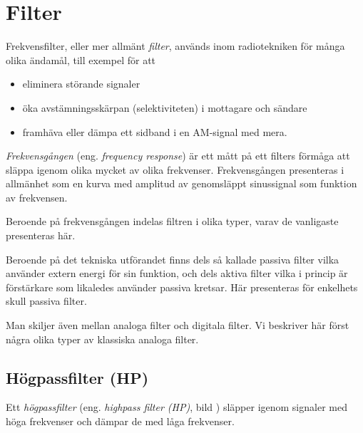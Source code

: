 \section{Filter}
\label{filter}

Frekvensfilter, eller mer allmänt \emph{filter}, används inom radiotekniken för
många olika ändamål, till exempel för att
\begin{itemize}
  \item eliminera störande signaler
  \item öka avstämningsskärpan (selektiviteten) i mottagare och sändare
  \item framhäva eller dämpa ett sidband i en AM-signal med mera.
\end{itemize}

\emph{Frekvensgången} (eng. \emph{frequency response}) är ett mått på ett
filters förmåga att släppa igenom olika mycket av olika frekvenser.
Frekvensgången presenteras i allmänhet som en kurva med amplitud av genomsläppt
sinussignal som funktion av frekvensen.

Beroende på frekvensgången indelas filtren i olika typer, varav de vanligaste presenteras här.

Beroende på det tekniska utförandet finns dels så kallade passiva filter vilka
använder extern energi för sin funktion, och dels aktiva filter vilka i princip
är förstärkare som likaledes använder passiva kretsar.
Här presenteras för enkelhets skull passiva filter.

Man skiljer även mellan analoga filter och digitala filter.
Vi beskriver här först några olika typer av klassiska analoga filter.

\subsection{Högpassfilter (HP)}



Ett \emph{högpassfilter} (eng. \emph{highpass filter (HP)}, bild ) släpper igenom
signaler med höga frekvenser och dämpar de med låga frekvenser.

